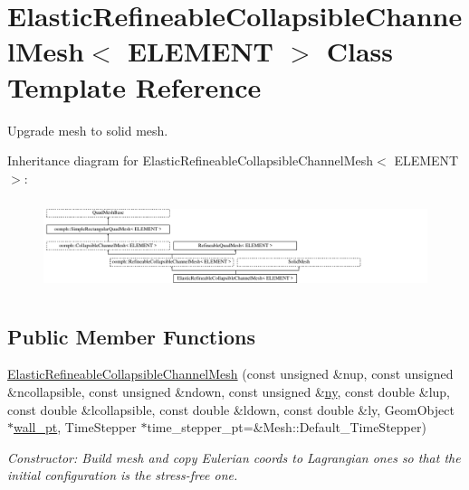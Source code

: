 \hypertarget{classElasticRefineableCollapsibleChannelMesh}{}\section{Elastic\+Refineable\+Collapsible\+Channel\+Mesh$<$ E\+L\+E\+M\+E\+NT $>$ Class Template Reference}
\label{classElasticRefineableCollapsibleChannelMesh}


Upgrade mesh to solid mesh.  


Inheritance diagram for Elastic\+Refineable\+Collapsible\+Channel\+Mesh$<$ E\+L\+E\+M\+E\+NT $>$\+:\begin{figure}[H]
\begin{center}
\leavevmode
\includegraphics[height=2.705314cm]{classElasticRefineableCollapsibleChannelMesh}
\end{center}
\end{figure}
\subsection*{Public Member Functions}
\begin{DoxyCompactItemize}
\item 
\hyperlink{classElasticRefineableCollapsibleChannelMesh_a38336374b6cc91fa4a1c124515d9c2be}{Elastic\+Refineable\+Collapsible\+Channel\+Mesh} (const unsigned \&nup, const unsigned \&ncollapsible, const unsigned \&ndown, const unsigned \&\hyperlink{classoomph_1_1SimpleRectangularQuadMesh_a45011f22dedd480392b1f376e4269921}{ny}, const double \&lup, const double \&lcollapsible, const double \&ldown, const double \&ly, Geom\+Object $\ast$\hyperlink{classoomph_1_1CollapsibleChannelMesh_a04ffeb61678763dfd250962ea9ba614b}{wall\+\_\+pt}, Time\+Stepper $\ast$time\+\_\+stepper\+\_\+pt=\&Mesh\+::\+Default\+\_\+\+Time\+Stepper)
\begin{DoxyCompactList}\small\item\em Constructor\+: Build mesh and copy Eulerian coords to Lagrangian ones so that the initial configuration is the stress-\/free one. \end{DoxyCompactList}\end{DoxyCompactItemize}
